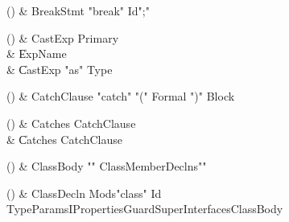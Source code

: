 \begin{bbgrammarappendix}{4.1in}

() & BreakStmt \label{prod:BreakStmt}  \: \xcd"break" Id\opt \xcd";"  \\


\end{bbgrammarappendix}

\begin{bbgrammarappendix}{4.3in}

() & CastExp \label{prod:CastExp}  \: Primary  \\

 &    \| ExpName \\
 &    \| CastExp \xcd"as" Type \\

\end{bbgrammarappendix}

\begin{bbgrammarappendix}{3.9in}

() & CatchClause \label{prod:CatchClause}  \: \xcd"catch" \xcd"(" Formal \xcd")" Block  \\


\end{bbgrammarappendix}

\begin{bbgrammarappendix}{4.3in}

() & Catches \label{prod:Catches}  \: CatchClause  \\

 &    \| Catches CatchClause \\

\end{bbgrammarappendix}

\begin{bbgrammarappendix}{4.1in}

() & ClassBody \label{prod:ClassBody}  \: \xcd"{" ClassMemberDeclns\opt \xcd"}"  \\


\end{bbgrammarappendix}

\begin{bbgrammarappendix}{4.0in}

() & ClassDecln \label{prod:ClassDecln}  \: Mods\opt \xcd"class" Id TypeParamsI\opt Properties\opt Guard\opt Super\opt Interfaces\opt ClassBody  \\


\end{bbgrammarappendix}

